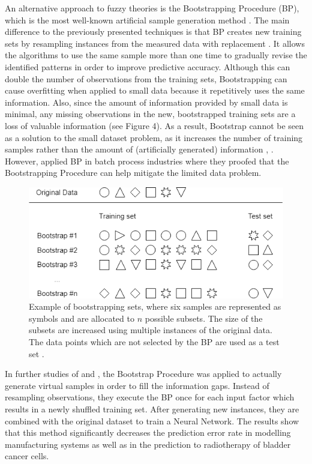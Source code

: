 \documentclass[parskip=full]{scrartcl}
\begin{document}
An alternative approach to fuzzy theories is the Bootstrapping Procedure (BP), 
which is the most well-known artificial sample generation method 
\cite{AbdulLateh.2017}. The main difference to the previously presented 
techniques is that BP creates new training sets by resampling instances from 
the measured data with replacement \cite{Efron.1993}. It allows the algorithms 
to use the same sample more than one time to gradually revise the identified 
patterns in order to improve predictive accuracy. Although this can double the 
number of observations from the training sets, Bootstrapping can cause 
overfitting when applied to small data because it repetitively uses the same 
information. Also, since the amount of information provided by small data is 
minimal, any missing observations in the new, bootstrapped training sets are a 
loss of valuable information (see Figure 4). As a result, Bootstrap cannot be 
seen as a solution to the small dataset problem, as it increases the number of 
training samples rather than the amount of (artificially generated) information 
\cite{Tsai.2015}, \cite{Li.2018}. However, \cite{Ivanescu.2006} applied BP in 
batch process industries where they proofed that the Bootstrapping Procedure 
can help mitigate the limited data problem.

\begin{figure}[H]
	\centering
	\includegraphics[width=0.6\linewidth]{./resources/bootstrapping_example}
	\caption{Example of bootstrapping sets, where six samples are represented 
	as symbols and are allocated to $\mathit{n}$ possible subsets. The size of 
	the subsets are increased using multiple instances of the original data. 
	The data points which are not selected by the BP are used as a test set 
	\cite{Kuhn.2013}.}
	\label{fig:bootstrappingexample}
\end{figure}

In further studies of \cite{Tsai.2008} and \cite{Chao.2011}, the Bootstrap 
Procedure was applied to actually generate virtual samples in order to fill the 
information gaps. Instead of resampling observations, they execute the BP once 
for each input factor which results in a newly shuffled training set. After 
generating new instances, they are combined with the original dataset to train 
a Neural Network. The results show that this method significantly decreases the 
prediction error rate in modelling manufacturing systems as well as in the 
prediction to radiotherapy of bladder cancer cells.
\end{document}
